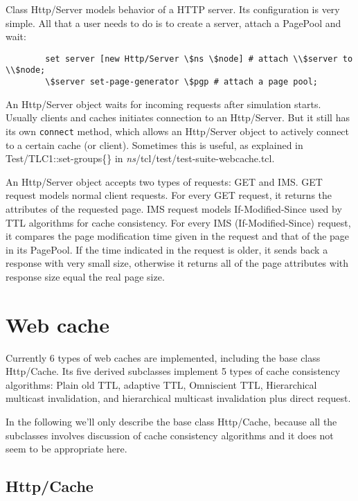 Class Http/Server models behavior of a HTTP server. Its
configuration is very simple. All that a user needs to do is to create 
a server, attach a PagePool and wait:

\begin{verbatim}
        set server [new Http/Server \$ns \$node] # attach \\$server to \\$node;
        \$server set-page-generator \$pgp # attach a page pool;
\end{verbatim}

An Http/Server object waits for incoming requests after simulation starts.
Usually clients and caches initiates connection to an Http/Server. But 
it still has its own {\tt connect} method, which allows an Http/Server 
object to actively connect to a certain cache (or client). Sometimes this
is useful, as explained in Test/TLC1::set-groups\{\} in 
\emph{ns}/tcl/test/test-suite-webcache.tcl.

An Http/Server object accepts two types of requests: GET and IMS.  GET
request models normal client requests. For every GET request, it
returns the attributes of the requested page.  IMS request models
If-Modified-Since used by TTL algorithms for cache consistency. For
every IMS (If-Modified-Since) request, it compares the page
modification time given in the request and that of the page in its
PagePool. If the time indicated in the request is older, it sends back
a response with very small size, otherwise it returns all of the page 
attributes with response size equal the real page size.


\section{Web cache}
\label{sec:webcache-cache}

Currently 6 types of web caches are implemented, including 
the base class Http/Cache. Its five derived subclasses 
implement 5 types of cache consistency algorithms: Plain old TTL, 
adaptive TTL, Omniscient TTL, Hierarchical multicast invalidation, 
and hierarchical multicast invalidation plus direct request.

In the following we'll only describe the base class Http/Cache, because 
all the subclasses involves discussion of cache consistency algorithms 
and it does not seem to be appropriate here.

\subsection{Http/Cache}
\label{sec:webcache-cache-base}

